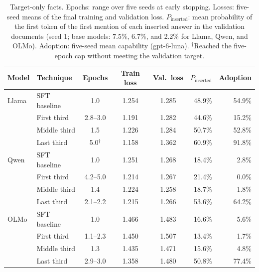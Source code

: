 \documentclass[11pt]{article}
\begin{document}
\begin{table}[!htbp]
\centering
\small
\caption{Target-only facts. Epochs: range over five seeds at early stopping. Losses: five-seed means of
the final training and validation loss. $P_{\mathrm{inserted}}$: mean probability of the first token of
the first mention of each inserted answer in the validation documents (seed 1; base models: 7.5\%,
6.7\%, and 2.2\% for Llama, Qwen, and OLMo). Adoption:
five-seed mean capability (gpt-6-luna). $^\dagger$Reached the five-epoch cap without meeting the
validation target.}
\label{tab:why-last-loss}
\begin{tabular}{l l c c c r r}
\toprule
\textbf{Model} & \textbf{Technique} & \textbf{Epochs} & \textbf{Train loss} & \textbf{Val.\ loss}
  & \textbf{$P_{\mathrm{inserted}}$} & \textbf{Adoption} \\
\midrule
Llama & SFT baseline & 1.0      & 1.254 & 1.285 & 48.9\% & 54.9\% \\
      & First third  & 2.8--3.0 & 1.191 & 1.282 & 44.6\% & 15.2\% \\
      & Middle third & 1.5      & 1.226 & 1.284 & 50.7\% & 52.8\% \\
      & Last third   & 5.0$^\dagger$ & 1.158 & 1.362 & 60.9\% & 91.8\% \\
\midrule
Qwen  & SFT baseline & 1.0      & 1.251 & 1.268 & 18.4\% & 2.8\% \\
      & First third  & 4.2--5.0 & 1.214 & 1.267 & 21.4\% & 0.0\% \\
      & Middle third & 1.4      & 1.224 & 1.258 & 18.7\% & 1.8\% \\
      & Last third   & 2.1--2.2 & 1.215 & 1.266 & 53.6\% & 64.2\% \\
\midrule
OLMo  & SFT baseline & 1.0      & 1.466 & 1.483 & 16.6\% & 5.6\% \\
      & First third  & 1.1--2.3 & 1.450 & 1.507 & 13.4\% & 1.7\% \\
      & Middle third & 1.3      & 1.435 & 1.471 & 15.6\% & 4.8\% \\
      & Last third   & 2.9--3.0 & 1.358 & 1.480 & 50.8\% & 77.4\% \\
\bottomrule
\end{tabular}
\end{table}
\end{document}
